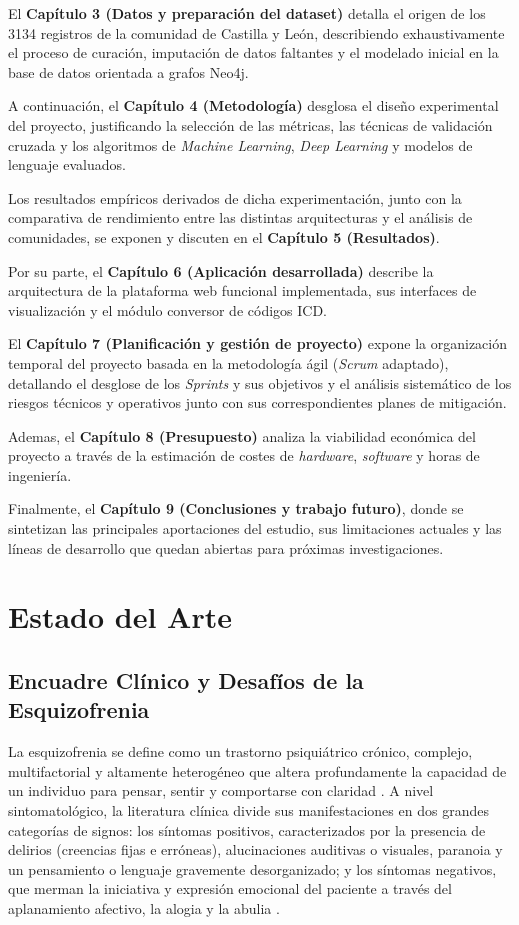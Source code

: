 \documentclass[12pt,a4paper,onecolumn,oneside]{report}
\begin{document}
El \textbf{Capítulo 3 (Datos y preparación del dataset)} detalla el origen de los 3134 registros de la comunidad de Castilla y León, describiendo exhaustivamente el proceso de curación, imputación de datos faltantes y el modelado inicial en la base de datos orientada a grafos Neo4j. 

A continuación, el \textbf{Capítulo 4 (Metodología)} desglosa el diseño experimental del proyecto, justificando la selección de las métricas, las técnicas de validación cruzada y los algoritmos de \textit{Machine Learning}, \textit{Deep Learning} y modelos de lenguaje evaluados. 

Los resultados empíricos derivados de dicha experimentación, junto con la comparativa de rendimiento entre las distintas arquitecturas y el análisis de comunidades, se exponen y discuten en el \textbf{Capítulo 5 (Resultados)}. 

Por su parte, el \textbf{Capítulo 6 (Aplicación desarrollada)} describe la arquitectura de la plataforma web funcional implementada, sus interfaces de visualización y el módulo conversor de códigos ICD.

El \textbf{Capítulo 7 (Planificación y gestión de proyecto)} expone la organización temporal del proyecto basada en la metodología ágil (\textit{Scrum} adaptado), detallando el desglose de los \textit{Sprints} y sus objetivos y el análisis sistemático de los riesgos técnicos y operativos junto con sus correspondientes planes de mitigación.

Ademas, el \textbf{Capítulo 8 (Presupuesto)} analiza la viabilidad económica del proyecto a través de la estimación de costes de \textit{hardware}, \textit{software} y horas de ingeniería.

Finalmente, el \textbf{Capítulo 9 (Conclusiones y trabajo futuro)}, donde se sintetizan las principales aportaciones del estudio, sus limitaciones actuales y las líneas de desarrollo que quedan abiertas para próximas investigaciones.


\chapter{Estado del Arte}

\section{Encuadre Clínico y Desafíos de la Esquizofrenia}

La esquizofrenia se define como un trastorno psiquiátrico crónico, complejo, multifactorial y altamente heterogéneo que altera profundamente la capacidad de un individuo para pensar, sentir y comportarse con claridad \cite{saboori2025predictive, schizonet2023}. A nivel sintomatológico, la literatura clínica divide sus manifestaciones en dos grandes categorías de signos: los síntomas positivos, caracterizados por la presencia de delirios (creencias fijas e erróneas), alucinaciones auditivas o visuales, paranoia y un pensamiento o lenguaje gravemente desorganizado; y los síntomas negativos, que merman la iniciativa y expresión emocional del paciente a través del aplanamiento afectivo, la alogia y la abulia \cite{montano2013esquizofrenia, schizonet2023}. 
\end{document}
